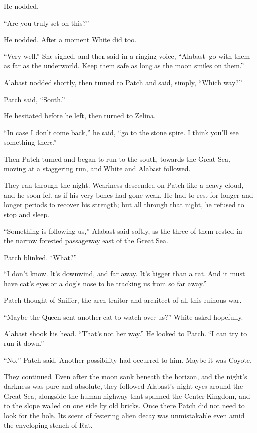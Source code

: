 \documentclass[ebook,oneside,openany,17pt]{memoir}
\begin{document}
He nodded.

“Are you truly set on this?”

He nodded. After a moment White did too.

“Very well.” She sighed, and then said in a ringing voice, “Alabast,
go with them as far as the underworld. Keep them safe as long as the
moon smiles on them.”

Alabast nodded shortly, then turned to Patch and said, simply, “Which
way?”

Patch said, “South.”

He hesitated before he left, then turned to Zelina.

“In case I don’t come back,” he said, “go to the stone spire. I think
you’ll see something there.”

Then Patch turned and began to run to the south, towards the Great
Sea, moving at a staggering run, and White and Alabast followed.

They ran through the night. Weariness descended on Patch like a heavy
cloud, and he soon felt as if his very bones had gone weak. He had to
rest for longer and longer periods to recover his strength; but all
through that night, he refused to stop and sleep.

“Something is following us,” Alabast said softly, as the three of them
rested in the narrow forested passageway east of the Great Sea.

Patch blinked. “What?”

“I don’t know. It’s downwind, and far away. It’s bigger than a
rat. And it must have cat’s eyes or a dog’s nose to be tracking us
from so far away.”

Patch thought of Sniffer, the arch-traitor and architect of all this
ruinous war.

“Maybe the Queen sent another cat to watch over us?” White asked
hopefully.

Alabast shook his head. “That’s not her way.” He looked to Patch. “I
can try to run it down.”

“No,” Patch said. Another possibility had occurred to him. Maybe it
was Coyote.

They continued. Even after the moon sank beneath the horizon, and the
night’s darkness was pure and absolute, they followed Alabast’s
night-eyes around the Great Sea, alongside the human highway that
spanned the Center Kingdom, and to the slope walled on one side by old
bricks. Once there Patch did not need to look for the hole. Its scent
of festering alien decay was unmistakable even amid the enveloping
stench of Rat.
\end{document}
